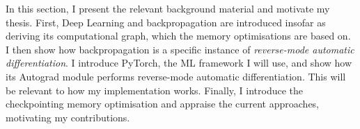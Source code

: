 In this section, I present the relevant background material and motivate my thesis. First, Deep Learning and backpropagation are introduced insofar as deriving its computational graph, which the memory optimisations are based on. I then show how backpropagation is a specific instance of \textit{reverse-mode automatic differentiation}. I introduce PyTorch, the ML framework I will use, and show how its Autograd module performs reverse-mode automatic differentiation. This will be relevant to how my implementation works. Finally, I introduce the checkpointing memory optimisation and appraise the current approaches, motivating my contributions.
